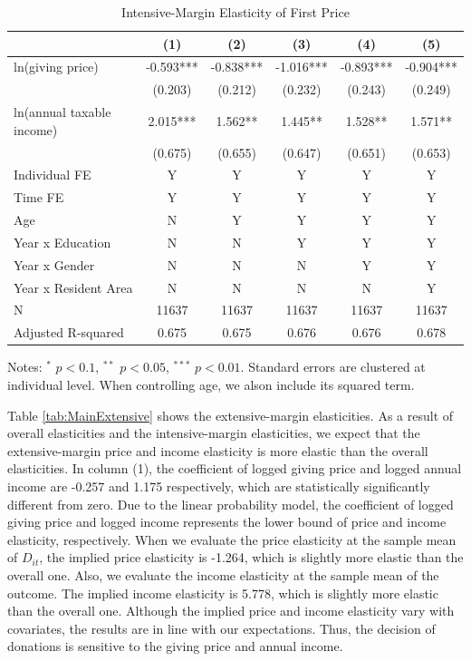 \documentclass[
  11pt,
  a4paper,
]{article}
\begin{document}
\begin{table}

\caption{\label{tab:MainIntensive}Intensive-Margin Elasticity of First Price}
\centering
\fontsize{9}{11}\selectfont
\begin{threeparttable}
\begin{tabular}[t]{lccccc}
\toprule
 & (1) & (2) & (3) & (4) & (5)\\
\midrule
ln(giving price) & -0.593*** & -0.838*** & -1.016*** & -0.893*** & -0.904***\\
 & (0.203) & (0.212) & (0.232) & (0.243) & (0.249)\\
ln(annual taxable income) & 2.015*** & 1.562** & 1.445** & 1.528** & 1.571**\\
 & (0.675) & (0.655) & (0.647) & (0.651) & (0.653)\\
Individual FE & Y & Y & Y & Y & Y\\
Time FE & Y & Y & Y & Y & Y\\
Age & N & Y & Y & Y & Y\\
Year x Education & N & N & Y & Y & Y\\
Year x Gender & N & N & N & Y & Y\\
Year x Resident Area & N & N & N & N & Y\\
N & 11637 & 11637 & 11637 & 11637 & 11637\\
Adjusted R-squared & 0.675 & 0.675 & 0.676 & 0.676 & 0.678\\
\bottomrule
\end{tabular}
\begin{tablenotes}
\item Notes: $^{*}$ $p < 0.1$, $^{**}$ $p < 0.05$, $^{***}$ $p < 0.01$. Standard errors are clustered at individual level. When controlling age, we alson include its squared term.
\end{tablenotes}
\end{threeparttable}
\end{table}

Table \ref{tab:MainExtensive} shows the extensive-margin elasticities.
As a result of overall elasticities and the intensive-margin elasticities,
we expect that the extensive-margin price and income elasticity is more elastic than the overall elasticities.
In column (1), the coefficient of logged giving price and logged annual income are -0.257 and 1.175 respectively,
which are statistically significantly different from zero.
Due to the linear probability model,
the coefficient of logged giving price and logged income represents the lower bound of price and income elasticity, respectively.
When we evaluate the price elasticity at the sample mean of \(D_{it}\),
the implied price elasticity is -1.264, which is slightly more elastic than the overall one.
Also, we evaluate the income elasticity at the sample mean of the outcome.
The implied income elasticity is 5.778, which is slightly more elastic than the overall one.
Although the implied price and income elasticity vary with covariates,
the results are in line with our expectations.
Thus, the decision of donations is sensitive to the giving price and annual income.
\end{document}

